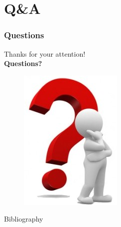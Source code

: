 \documentclass[10pt]{beamer}
\begin{document}


\section*{Q\&A}
\begin{frame}
  \frametitle{Questions}

  \begin{center}
    Thanks for your attention!\\
    \vspace{0.5cm}
    {\LARGE\textbf{Questions?}}
  \end{center}

  \begin{figure}[b!]
    \begin{center}
      \includegraphics[width=0.25\columnwidth]{./pictures/Questions.jpg}
    \end{center}  
  \end{figure}
\end{frame}

%

\begin{frame}[allowframebreaks]{Bibliography}
  \nocite{*}
  
  
\end{frame}
\end{document}
